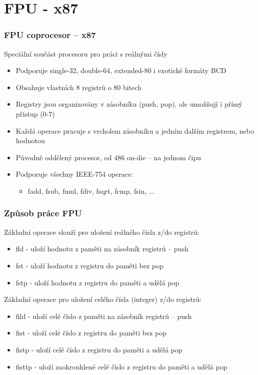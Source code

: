 \documentclass{beamer}
\begin{document}
\section{FPU - x87}


\begin{frame}
\frametitle{FPU coprocesor – x87}
Speciální součást procesoru pro práci s reálnými čísly
\begin{itemize}
\item Podporuje single-32, double-64, extended-80 i exotické formáty BCD
\item Obsahuje vlastních 8 registrů o 80 bitech
\item Registry jsou organizovány v zásobníku (push, pop), ale umožňují i přímý přístup (0-7)
\item Každá operace pracuje s vrcholem zásobníku a jedním dalším registrem, nebo hodnotou
\item Původně oddělený procesor, od 486 on-die -- na jednom čipu
\item Podporuje všechny IEEE-754 operace:
\begin{itemize}
\item fadd, fsub, fmul, fdiv, fsqrt, fcmp, fsin, ...
\end{itemize}
\end{itemize}
\end{frame}

\begin{frame}
\frametitle{Způsob práce FPU}
Základní operace slouží pro uložení reálného čísla z/do registrů:
\begin{itemize}
\item fld - uloží hodnotu z paměti na zásobník registrů -- push
\item fst - uloží hodnotu z registru do paměti bez pop
\item fstp - uloží hodnotu z registru do paměti a udělá pop
\end{itemize}
Základní operace pro uložení celého čísla (integer) z/do registrů:
\begin{itemize}
\item fild - uloží celé číslo z paměti na zásobník registrů -- push
\item fist - uloží celé číslo z registru do paměti bez pop
\item fistp - uloží celé číslo z registru do paměti a udělá pop
\item fisttp - uloží zaokrouhlené celé číslo z registru do paměti a udělá pop
\end{itemize}
\end{frame}
\end{document}

